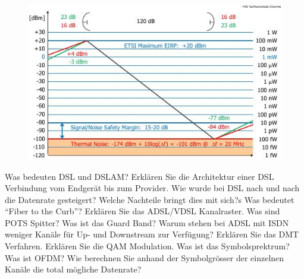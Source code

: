 \documentclass[ngerman,a4paper,12pt]{scrreprt}
\begin{document}
		\begin{figure}[H]
		\centering
		\includegraphics[width=\textwidth]{img/R6.1.jpg}
		\caption{}
		\label{pegelplan}
	\end{figure}
\olS


\olR
	\li Was bedeuten DSL und DSLAM?
	\li Erklären Sie die Architektur einer DSL Verbindung vom Endgerät bis zum Provider.
	\li Wie wurde bei DSL nach und nach die Datenrate gesteigert? Welche Nachteile bringt dies mit sich?s
	\li Was bedeutet ``Fiber to the Curb''?
	\li Erklären Sie das ADSL/VDSL Kanalraster.
	\li Was sind POTS Spitter? Was ist das Guard Band?
	\li Warum stehen bei ADSL mit ISDN weniger Kanäle für Up- und Downstream zur Verfügung?
	\li Erklären Sie das DMT Verfahren.
	\li Erklären Sie die QAM Modulation.
	\li Was ist das Symbolsprektrum? Was ist OFDM?
	\li Wie berechnen Sie anhand der Symbolgrösser der einzelnen Kanäle die total mögliche Datenrate?
\olS
\end{document}
